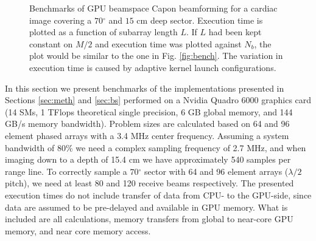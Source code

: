 \documentclass[journal]{IEEEtran}
\newcommand{\degree}{\ensuremath{^\circ}}
\begin{document}
\begin{figure}[!t]
\centerline{
\hfil
{}}
\caption{Benchmarks of GPU beamspace Capon beamforming for a cardiac image covering a $70 \degree$ and $15$ cm deep sector. Execution time is plotted as a function of subarray length $L$.  If $L$ had been kept constant on $M/2$ and execution time was plotted against $N_b$, the plot would be similar to the one in Fig. \ref{fig:bench}. The variation in execution time is caused by adaptive kernel launch configurations.}
\label{fig:benchBS}
\end{figure}
In this section we present benchmarks of the implementations presented in Sections \ref{sec:meth} and \ref{sec:bs} performed on a Nvidia Quadro 6000 graphics card (14 SMs, 1 TFlops theoretical single precision, 6 GB global memory, and 144 GB/s memory bandwidth). Problem sizes are calculated based on 64 and 96 element phased arrays with a 3.4 MHz center frequency. Assuming a system bandwidth of 80\% we need a complex sampling frequency of 2.7 MHz, and when imaging down to a depth of 15.4 cm we have approximately 540 samples per range line. To correctly sample a $70\degree$ sector with 64 and 96 element arrays ($\lambda/2$ pitch), we need at least 80 and 120 receive beams respectively. The presented execution times do not include transfer of data from CPU- to the GPU-side, since data are assumed to be pre-delayed and available in GPU memory. What is included are all calculations, memory transfers from global to near-core GPU memory, and near core memory access. 
\end{document}
